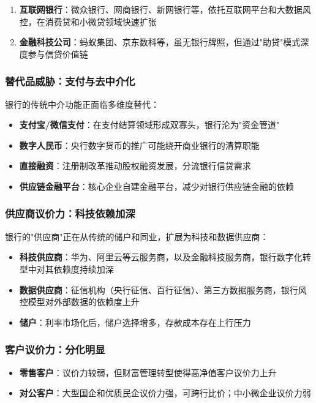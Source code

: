 \begin{enumerate}[leftmargin=2em]
  \item \textbf{互联网银行}：微众银行、网商银行、新网银行等，依托互联网平台和大数据风控，在消费贷和小微贷领域快速扩张
  \item \textbf{金融科技公司}：蚂蚁集团、京东数科等，虽无银行牌照，但通过"助贷"模式深度参与信贷价值链
\end{enumerate}

\subsubsection{替代品威胁：支付与去中介化}

银行的传统中介功能正面临多维度替代：

\begin{itemize}[leftmargin=2em]
  \item \textbf{支付宝/微信支付}：在支付结算领域形成双寡头，银行沦为"资金管道"
  \item \textbf{数字人民币}：央行数字货币的推广可能绕开商业银行的清算职能
  \item \textbf{直接融资}：注册制改革推动股权融资发展，分流银行信贷需求
  \item \textbf{供应链金融平台}：核心企业自建金融平台，减少对银行供应链金融的依赖
\end{itemize}

\subsubsection{供应商议价力：科技依赖加深}

银行的"供应商"正在从传统的储户和同业，扩展为科技和数据供应商：

\begin{itemize}[leftmargin=2em]
  \item \textbf{科技供应商}：华为、阿里云等云服务商，以及金融科技服务商，银行数字化转型中对其依赖度持续加深
  \item \textbf{数据供应商}：征信机构（央行征信、百行征信）、第三方数据服务商，银行风控模型对外部数据的依赖度上升
  \item \textbf{储户}：利率市场化后，储户选择增多，存款成本存在上行压力
\end{itemize}

\subsubsection{客户议价力：分化明显}

\begin{itemize}[leftmargin=2em]
  \item \textbf{零售客户}：议价力较弱，但财富管理转型使得高净值客户议价力上升
  \item \textbf{对公客户}：大型国企和优质民企议价力强，可跨行比价；中小微企业议价力弱
\end{itemize}

